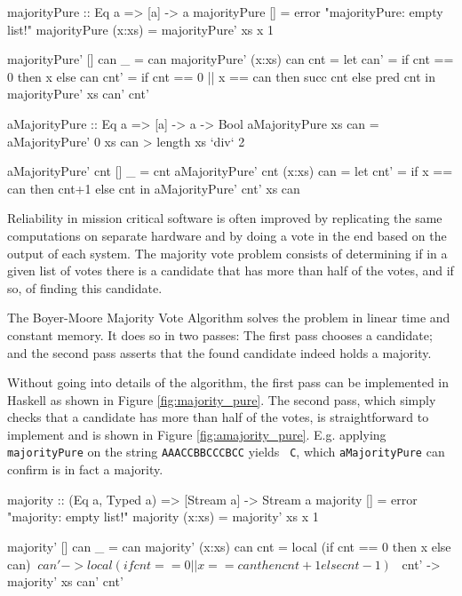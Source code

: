 \begin{figure*}
\begin{code}
majorityPure :: Eq a => [a] -> a
majorityPure []     = error "majorityPure: empty list!"
majorityPure (x:xs) = majorityPure' xs x 1

majorityPure' []     can _   = can
majorityPure' (x:xs) can cnt =
  let
    can' = if cnt == 0 then x else can
    cnt' = if cnt == 0 || x == can then succ cnt else pred cnt
  in
    majorityPure' xs can' cnt'
\end{code}
\caption{The first pass of the majority vote algorithm in Haskell.}
\label{fig:majority_pure}
\end{figure*}

\begin{figure*}
\begin{code}
aMajorityPure :: Eq a => [a] -> a -> Bool
aMajorityPure xs can = aMajorityPure' 0 xs can > length xs `div` 2

aMajorityPure' cnt []     _   = cnt
aMajorityPure' cnt (x:xs) can =
  let
    cnt' = if x == can then cnt+1 else cnt
  in
    aMajorityPure' cnt' xs can
\end{code}
\caption{The second pass of the majority vote algorithm in Haskell.}
\label{fig:amajority_pure}
\end{figure*}

Reliability in mission critical software is often improved by replicating
the same computations on separate hardware and by doing a vote in the end
based on the output of each system. The majority vote problem consists of
determining if in a given list of votes there is a candidate that has more
than half of the votes, and if so, of finding this candidate.

The Boyer-Moore Majority Vote Algorithm \cite{MooreBoyer82,Hesselink2005} solves
the problem in linear time and constant memory. It does so in two passes: The
first pass chooses a candidate; and the second pass asserts that the
found candidate indeed holds a majority.

Without going into details of the algorithm, the first pass can be implemented
in Haskell as shown in Figure \ref{fig:majority_pure}. The second pass, which
simply checks that a candidate has more than half of the votes, is
straightforward to implement and is shown in Figure \ref{fig:amajority_pure}.
E.g. applying {\tt majorityPure} on the string {\tt AAACCBBCCCBCC} yields {\tt
  C}, which {\tt aMajorityPure} can confirm is in fact a majority.

\begin{figure*}[ht]
\begin{code}
majority :: (Eq a, Typed a) => [Stream a] -> Stream a
majority []     = error "majority: empty list!"
majority (x:xs) = majority' xs x 1

majority' []     can _   = can
majority' (x:xs) can cnt =
  local
    (if cnt == 0 then x else can) $
      \ can' ->
        local (if cnt == 0 || x == can then cnt+1 else cnt-1) $
          \ cnt' ->
            majority' xs can' cnt'
\end{code}
\caption{The first pass of the majority vote algorithm in Copilot.}
\label{fig:majority}
\end{figure*}

